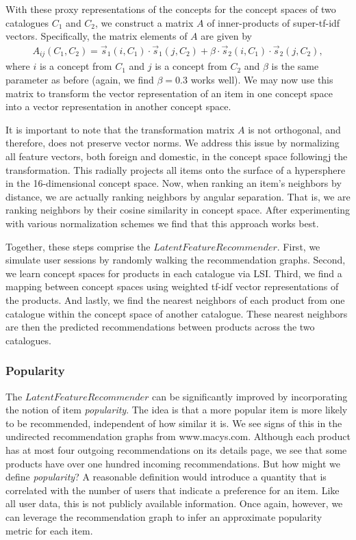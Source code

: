 \documentclass[11pt]{article}
\begin{document}
With these proxy representations of the concepts for the concept spaces of two
catalogues $C_1$ and $C_2$, we construct a matrix $A$ of inner-products of
super-tf-idf vectors.  Specifically, the matrix elements of $A$ are given by
\begin{align}
A_{ij}(C_1,C_2) = \vec{s}_1(i,C_1) \cdot \vec{s}_1(j,C_2) + \beta \cdot
\vec{s}_2(i,C_1) \cdot \vec{s}_2(j,C_2),
\end{align}
where $i$ is a concept from $C_1$ and $j$ is a concept from $C_2$ and $\beta$ is
the same parameter as before (again, we find $\beta=0.3$ works well).  We may
now use this matrix to transform the vector representation of an item in one
concept space into a vector representation in another concept space.

It is important to note that the transformation matrix $A$ is not orthogonal, and
therefore, does not preserve vector norms. We address this issue by normalizing
all feature vectors, both foreign and domestic, in the concept space followingj
the transformation. This radially projects all items onto the surface of a
hypersphere in the 16-dimensional concept space. Now, when ranking an item's
neighbors by distance, we are actually ranking neighbors by angular separation.
That is, we are ranking neighbors by their cosine similarity in concept space.
After experimenting with various normalization schemes we find that this
approach works best.

Together, these steps comprise the $LatentFeatureRecommender$. First, we
simulate user sessions by randomly walking the recommendation graphs. Second, we
learn concept spaces for products in each catalogue via LSI. Third, we find a
mapping between concept spaces using weighted tf-idf vector representations of
the products. And lastly, we find the nearest neighbors of each product from one
catalogue within the concept space of another catalogue. These nearest neighbors
are then the predicted recommendations between products across the two
catalogues.

\subsubsection*{Popularity}
The $LatentFeatureRecommender$ can be significantly improved by incorporating
the notion of item {\em popularity}. The idea is that a more popular item is
more likely to be recommended, independent of how similar it is. We see signs of
this in the undirected recommendation graphs from www.macys.com. Although each
product has at most four outgoing recommendations on its details page, we see
that some products have over one hundred incoming recommendations. But how
might we define {\em popularity}? A reasonable definition would introduce a
quantity that is correlated with the number of users that indicate a preference
for an item. Like all user data, this is not publicly available information.
Once again, however, we can leverage the recommendation graph to infer an
approximate popularity metric for each item.
\end{document}
